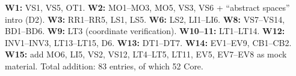 \textbf{W1:} VS1, VS5, OT1. \textbf{W2:} MO1--MO3, MO5, VS3, VS6 + ``abstract spaces'' intro (D2). \textbf{W3:} RR1--RR5, LS1, LS5. \textbf{W6:} LS2, LI1--LI6. \textbf{W8:} VS7--VS14, BD1--BD6. \textbf{W9:} LT3 (coordinate verification). \textbf{W10--11:} LT1--LT14. \textbf{W12:} INV1--INV3, LT13--LT15, D6. \textbf{W13:} DT1--DT7. \textbf{W14:} EV1--EV9, CB1--CB2. \textbf{W15:} add MO6, LI5, VS2, VS12, LT4--LT5, LT11, EV5, EV7--EV8 as mock material. Total addition: 83 entries, of which 52 Core.


